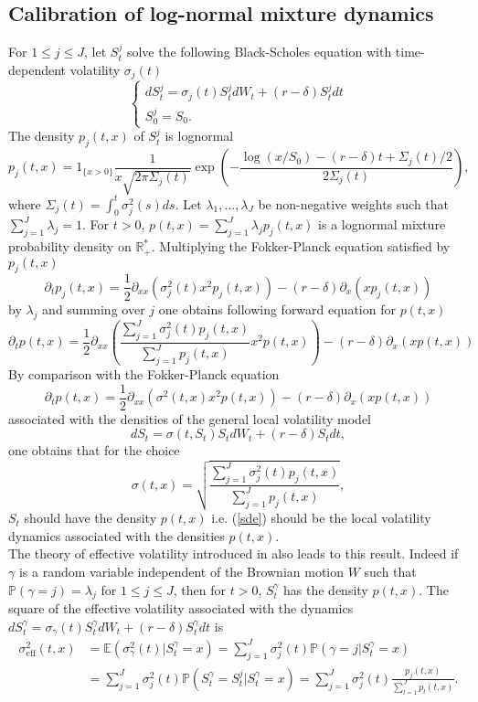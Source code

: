 \documentclass[11pt]{article}
\begin{document}
\subsection*{Calibration of log-normal mixture dynamics}
For $1\leq j\leq J$, let $S^j_t$ solve the following Black-Scholes
equation with time-dependent volatility $\sigma_j(t)$
\begin{equation*}
   \begin{cases}
      dS^j_t=\sigma_j(t)S^j_tdW_t+(r-\delta)S^j_tdt\\
S^j_0=S_0.
   \end{cases}
\end{equation*}
The density $p_j(t,x)$ of $S^j_t$ is lognormal
$$p_j(t,x)=1_{\{x>0\}}\frac{1}{x\sqrt{2\pi\Sigma_j(t)}}\exp\left(-\frac{\log(x/S_0)-(r-\delta)t+\Sigma_j(t)/2}{2\Sigma_j(t)}\right),$$
where $\Sigma_j(t)=\int_0^t\sigma^2_j(s)ds$.
Let $\lambda_1,\hdots,\lambda_J$ be non-negative weights such that
$\sum_{j=1}^J\lambda_j=1$. For $t>0$,
$p(t,x)=\sum_{j=1}^J\lambda_jp_j(t,x)$ is a lognormal mixture probability
density on ${\mathbb R}_+^*$.
Multiplying the Fokker-Planck equation satisfied by $p_j(t,x)$
$$\partial_tp_j(t,x)=\frac{1}{2}\partial_{xx}(\sigma_j^2(t)x^2p_j(t,x))-(r-\delta)\partial_x(xp_j(t,x))
$$ by $\lambda_j$ and summing over $j$ one obtains following forward
equation for $p(t,x)$ 
$$\partial_tp(t,x)=\frac{1}{2}\partial_{xx}\left(\frac{\sum_{j=1}^J\sigma_j^2(t)p_j(t,x)}{\sum_{j=1}^Jp_j(t,x)}x^2p(t,x)\right)-(r-\delta)\partial_x(xp(t,x))$$
By comparison with the Fokker-Planck equation
$$\partial_tp(t,x)=\frac{1}{2}\partial_{xx}(\sigma^2(t,x)x^2p(t,x))-(r-\delta)\partial_x(xp(t,x))$$
associated with the densities of the general local
volatility model 
\begin{equation}
 dS_t=\sigma(t,S_t)S_tdW_t+(r-\delta)S_tdt,\label{sde}  
\end{equation}
one obtains that for the choice
\begin{equation}
   \sigma(t,x)=\sqrt{\frac{\sum_{j=1}^J\sigma_j^2(t)p_j(t,x)}{\sum_{j=1}^Jp_j(t,x)}},\label{defsig}
\end{equation}
$S_t$ should have the density $p(t,x)$ i.e. (\ref{sde}) should be the local volatility
dynamics associated with the densities $p(t,x)$.\\
The theory of effective volatility introduced in \cite{DerKan} also
leads to this result. Indeed if $\gamma$ is a random variable
independent of the Brownian motion $W$ such that ${\mathbb
  P}(\gamma=j)=\lambda_j$ for $1\leq j\leq J$, then for $t>0$,
$S^\gamma_t$ has the density $p(t,x)$. The square of the effective volatility
associated with the dynamics
$dS^\gamma_t=\sigma_\gamma(t)S^\gamma_tdW_t+(r-\delta)S^\gamma_tdt$ is
\begin{align*}\sigma_{\mbox{eff}}^2(t,x)&={\mathbb
  E}(\sigma^2_\gamma(t)|S^\gamma_t=x)=\sum_{j=1}^J\sigma^2_j(t){\mathbb
  P}(\gamma=j|S^\gamma_t=x)\\
&=\sum_{j=1}^J\sigma^2_j(t){\mathbb
  P}(S^\gamma_t=S^j_t|S^\gamma_t=x)=\sum_{j=1}^J\sigma^2_j(t)\frac{p_j(t,x)}{\sum_{l=1}^Jp_l(t,x)}.\end{align*}
\end{document}
